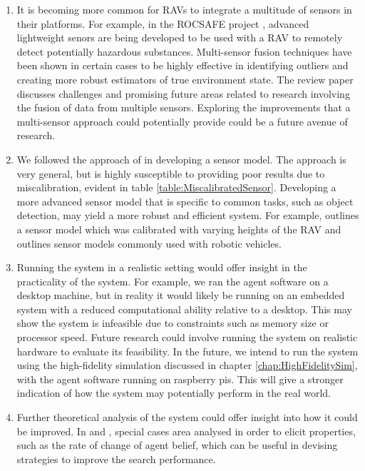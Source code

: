 \begin{enumerate}
    \item It is becoming more common for RAVs to integrate a multitude of sensors in their platforms. For example, in the ROCSAFE project \cite{Bagherzadeh2017ROCSAFE:Incidents}, advanced lightweight senors are being developed to be used with a RAV to remotely detect potentially hazardous substances. Multi-sensor fusion techniques have been shown in certain cases to be highly effective in identifying outliers and creating more robust estimators of true environment state. The review paper \cite{Khaleghi2013MultisensorState-of-the-art} discusses challenges and promising future areas related to research involving the fusion of data from multiple sensors. Exploring the improvements that a multi-sensor approach could potentially provide could be a future avenue of research.
    \item  We followed the approach of \cite{Chung2007ASearch} in developing a sensor model. The approach is very general, but is highly susceptible to providing poor results due to miscalibration, evident in table \ref{table:MiscalibratedSensor}. Developing a more advanced sensor model that is specific to common tasks, such as object detection, may yield a more robust and efficient system. For example, \cite{Symington2010ProbabilisticUAVs} outlines a sensor model which was calibrated with varying heights of the RAV and \cite{ThrunLearningModels} outlines sensor models commonly used with robotic vehicles.
    \item Running the system in a realistic setting would offer insight in the practicality of the system. For example, we ran the agent software on a desktop machine, but in reality it would likely be running on an embedded system with a reduced computational ability relative to a desktop. This may show the system is infeasible due to constraints such as memory size or processor speed. Future research could involve running the system on realistic hardware to evaluate its feasibility. In the future, we intend to run the system using the high-fidelity simulation discussed in chapter \ref{chap:HighFidelitySim}, with the agent software running on raspberry pis. This will give a stronger indication of how the system may potentially perform in the real world.
    \item Further theoretical analysis of the system could offer insight into how it could be improved. In \cite{Chung2012AnalysisStrategies} and \cite{Chung2009ProbabilisticAgents}, special cases area analysed in order to elicit properties, such as the rate of change of agent belief, which can be useful in devising strategies to improve the search performance.
\end{enumerate}